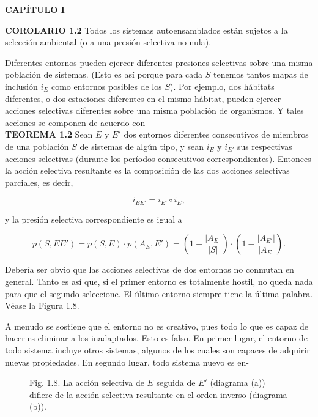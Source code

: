 \newpage
\fancyhf{}
\fancyhead[l]{\thepage}
\begin{center}
{\fontsize{16}{18}\selectfont \textbf{CAPÍTULO I}}
\end{center}
\vspace{0.5cm}

{\fontsize{13}{15}\selectfont
\textbf{COROLARIO 1.2} Todos los sistemas autoensamblados están sujetos a la selección ambiental (o a una presión selectiva no nula).

Diferentes entornos pueden ejercer diferentes presiones selectivas sobre una misma población de sistemas. (Esto es así porque para cada \( S \) tenemos tantos mapas de inclusión \( i_E \) como entornos posibles de los \( S \)). Por ejemplo, dos hábitats diferentes, o dos estaciones diferentes en el mismo hábitat, 
pueden ejercer acciones selectivas diferentes sobre una misma población de organismos. Y tales acciones se componen de acuerdo con \\

\textbf{TEOREMA 1.2} Sean \( E \) y \( E' \) dos entornos diferentes consecutivos de miembros de una población \( S \) de sistemas de algún tipo, y sean \( i_E \) y \( i_{E'} \) sus respectivas acciones selectivas (durante los períodos consecutivos correspondientes). Entonces la acción selectiva resultante es la composición de las dos acciones selectivas parciales, es decir,

\[i_{EE'} = i_{E'} \circ i_E,\]

y la presión selectiva correspondiente es igual a

\[p(S, EE') = p(S, E) \cdot p(A_E, E') = \left( 1 - \frac{|A_E|}{|S|} \right) \cdot \left( 1 - \frac{|A_{E'}|}{|A_E|} \right).\]

Debería ser obvio que las acciones selectivas de dos entornos no conmutan en general. Tanto es así que, si el primer entorno es totalmente hostil, no queda nada para que el segundo seleccione. El último entorno siempre tiene la última palabra. Véase la Figura 1.8.

A menudo se sostiene que el entorno no es creativo, pues todo lo que es capaz de hacer es eliminar a los inadaptados. Esto es falso. En primer lugar, el entorno de todo sistema incluye otros sistemas, algunos de los cuales son capaces de adquirir nuevas propiedades. En segundo lugar, todo sistema nuevo es en-
}

\begin{figure}[h!]
    \centering
    \caption*{Fig. 1.8. La acción selectiva de \( E \) seguida de \( E' \) (diagrama (a)) difiere de la acción selectiva resultante en el orden inverso (diagrama (b)).}
\end{figure}

